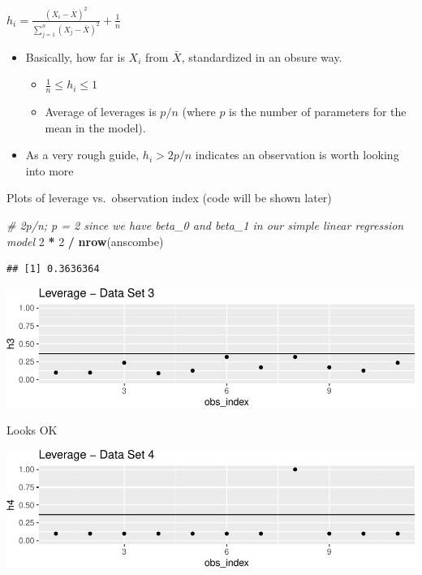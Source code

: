 \documentclass[]{extarticle}
\newenvironment{Shaded}{\begin{snugshade}}{\end{snugshade}}
\newcommand{\KeywordTok}[1]{\textcolor[rgb]{0.13,0.29,0.53}{\textbf{#1}}}
\newcommand{\DecValTok}[1]{\textcolor[rgb]{0.00,0.00,0.81}{#1}}
\newcommand{\StringTok}[1]{\textcolor[rgb]{0.31,0.60,0.02}{#1}}
\newcommand{\CommentTok}[1]{\textcolor[rgb]{0.56,0.35,0.01}{\textit{#1}}}
\newcommand{\OperatorTok}[1]{\textcolor[rgb]{0.81,0.36,0.00}{\textbf{#1}}}
\newcommand{\NormalTok}[1]{#1}
\providecommand{\tightlist}{%
  \setlength{\itemsep}{0pt}\setlength{\parskip}{0pt}}
\begin{document}
\(h_i = \frac{(X_i - \bar{X})^2}{\sum_{j=1}^n (X_j - \bar{X})^2} + \frac{1}{n}\)

\begin{itemize}
\tightlist
\item
  Basically, how far is \(X_i\) from \(\bar{X}\), standardized in an
  obsure way.

  \begin{itemize}
  \tightlist
  \item
    \(\frac{1}{n} \leq h_i \leq 1\)
  \item
    Average of leverages is \(p/n\) (where \(p\) is the number of
    parameters for the mean in the model).
  \end{itemize}
\item
  As a very rough guide, \(h_i > 2p/n\) indicates an observation is
  worth looking into more
\end{itemize}

Plots of leverage vs.~observation index (code will be shown later)

\begin{Shaded}
\begin{Highlighting}[]
\CommentTok{# 2p/n; p = 2 since we have beta_0 and beta_1 in our simple linear regression model}
\DecValTok{2} \OperatorTok{*}\StringTok{ }\DecValTok{2} \OperatorTok{/}\StringTok{ }\KeywordTok{nrow}\NormalTok{(anscombe)}
\end{Highlighting}
\end{Shaded}

\begin{verbatim}
## [1] 0.3636364
\end{verbatim}

\includegraphics{20190417_residual_diagnostics_files/figure-latex/unnamed-chunk-3-1.pdf}

Looks OK

\includegraphics{20190417_residual_diagnostics_files/figure-latex/unnamed-chunk-4-1.pdf}
\end{document}
